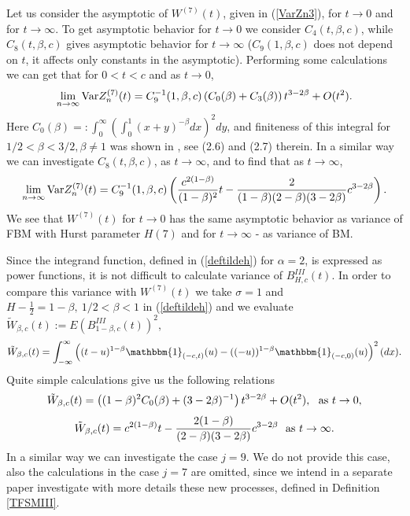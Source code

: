 \documentclass[12pt]{article}
\def\a{\alpha}
\def\b{\beta}
\def\s{\sigma}
\newcommand{\ind}[1]{\mathbbm{1}_{#1}}
\theoremstyle{plain}
\theoremstyle{definition}
\begin{document}
Let us consider the asymptotic of $W^{(7)}(t)$, given in (\ref{VarZn3}), for $t\to 0$ and for $t\to \infty$.
To get asymptotic behavior for $t \to 0$ we consider $C_{4}(t, \b, c)$, while $C_{8}(t, \b, c)$ gives asymptotic  behavior for $t \to \infty$  ($C_{9}(1, \b, c)$ does not depend on $t$, it affects only constants in the asymptotic).
 Performing some calculations we can get that for $0<t<c$ and as $t\to 0$,
\begin{equation}\label{VarZn5}
\lim_{n\to \infty}{\rm Var}Z_n^{(7)}(t)=C_9^{-1}(1, \b, c)\left (C_0(\b)+C_3(\b)\right )t^{3-2\b}+O(t^2).
\end{equation}
%
Here $C_0(\b)=:\int_0^{\infty}\left (\int_0^{1}(x+y)^{-\b} dx\right )^2 dy$, and finiteness of this integral for $1/2<\b<3/2, \b\ne 1$ was shown in \cite{Paul21}, see (2.6) and (2.7) therein.
In a similar way we can investigate $C_{8}(t, \b, c)$, as $t\to \infty$, and to find that   as $t \to \infty$,
\begin{equation}\label{VarZn6}
\lim_{n\to \infty}{\rm Var}Z_n^{(7)}(t)=C_9^{-1}(1, \b, c)\left (\frac{c^{2(1-\b)}}{(1-\b)^{2}}t -\frac{2}{(1-\b)(2-\b)(3-2\b)}c^{3-2\b}\right ).
\end{equation}
 We see  that $W^{(7)}(t)$ for $t\to 0$  has the same asymptotic behavior  as variance of FBM with Hurst parameter $H(7)$  and for $t\to \infty$ - as variance of BM.

Since the integrand function, defined in (\ref{deftildeh}) for $\a=2$, is expressed as power functions, it is not difficult to calculate variance of  $B_{H, c}^{III}(t)$. In order to compare this variance with $W^{(7)}(t)$ we take  $\s=1$ and $H-\frac{1}{2}=1-\b, \ 1/2 <\b<1$  in (\ref{deftildeh}) and we evaluate ${\tilde W}_{\b,c}(t):=E\left (B_{1-\b, c}^{III}(t)\right )^2$,
\begin{equation*}\label{VarTFBM3}
{\tilde W}_{\b,c}(t)=\int_{-\infty}^{\infty} \left ((t-u)^{1-\b}\ind{(-c, t)}(u)- ((-u))^{1-\b}\ind{(-c, 0)}(u)\right )^2 (dx).
\end{equation*}
Quite simple calculations give us the following relations
\begin{equation}\label{VarTFBM3A}
{\tilde W}_{\b,c}(t)= \left ((1-\b)^{2} C_0(\b)+(3-2\b)^{-1}\right )t^{3-2\b}+O(t^2),\ \ {\rm as} \ t\to 0,
\end{equation}
\begin{equation}\label{VarTFBM3B}
{\tilde W}_{\b,c}(t)=c^{2(1-\b)}t -\frac{2(1-\b)}{(2-\b)(3-2\b)}c^{3-2\b} \ \ {\rm as}\ t\to \infty.
\end{equation}
In a similar way we can investigate the case $j=9$. We do not provide this case, also the calculations in the case $j=7$ are omitted, since we intend in a separate paper investigate with more details these new  processes, defined in Definition \ref{TFSMIII}.
\end{document}
